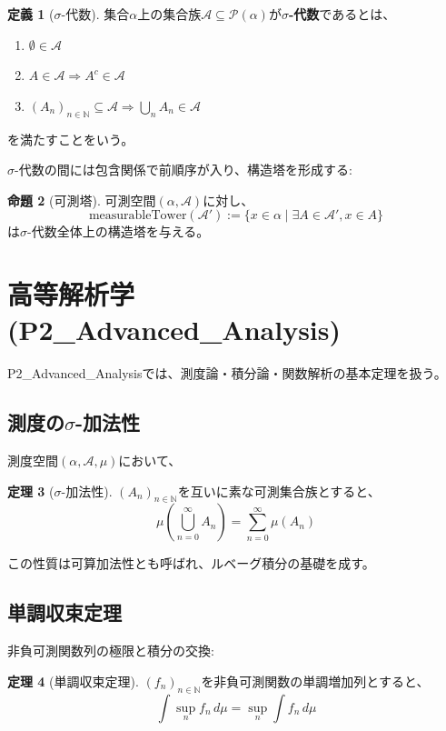 \documentclass[a4paper,12pt]{ltjsarticle}
\theoremstyle{definition}
\newtheorem{theorem}{定理}[section]
\newtheorem{proposition}[theorem]{命題}
\newtheorem{definition}[theorem]{定義}
\begin{document}
\begin{definition}[$\sigma$-代数]\label{def:sigma-algebra}
集合$\alpha$上の集合族$\mathcal{A} \subseteq \mathcal{P}(\alpha)$が\textbf{$\sigma$-代数}であるとは、
\begin{enumerate}
\item $\emptyset \in \mathcal{A}$
\item $A \in \mathcal{A} \Rightarrow A^c \in \mathcal{A}$
\item $(A_n)_{n \in \mathbb{N}} \subseteq \mathcal{A} \Rightarrow \bigcup_{n} A_n \in \mathcal{A}$
\end{enumerate}
を満たすことをいう。
\end{definition}

$\sigma$-代数の間には包含関係で前順序が入り、構造塔を形成する:

\begin{proposition}[可測塔]\label{prop:measurable-tower}
可測空間$(\alpha, \mathcal{A})$に対し、
\[
\text{measurableTower}(\mathcal{A}') := \{x \in \alpha \mid \exists A \in \mathcal{A}', x \in A\}
\]
は$\sigma$-代数全体上の構造塔を与える。
\end{proposition}

\section{高等解析学(P2\_Advanced\_Analysis)}

P2\_Advanced\_Analysisでは、測度論・積分論・関数解析の基本定理を扱う。

\subsection{測度の$\sigma$-加法性}
測度空間$(\alpha, \mathcal{A}, \mu)$において、

\begin{theorem}[$\sigma$-加法性]\label{thm:sigma-additivity}
$(A_n)_{n \in \mathbb{N}}$を互いに素な可測集合族とすると、
\[
\mu\left(\bigcup_{n=0}^\infty A_n\right) = \sum_{n=0}^\infty \mu(A_n)
\]
\end{theorem}

この性質は可算加法性とも呼ばれ、ルベーグ積分の基礎を成す。

\subsection{単調収束定理}
非負可測関数列の極限と積分の交換:

\begin{theorem}[単調収束定理]\label{thm:monotone-convergence}
$(f_n)_{n \in \mathbb{N}}$を非負可測関数の単調増加列とすると、
\[
\int \sup_{n} f_n \, d\mu = \sup_{n} \int f_n \, d\mu
\]
\end{theorem}
\end{document}
